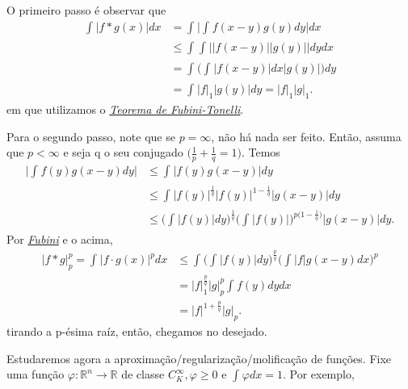 \documentclass[MeasureTheory/measure_theory.tex]{subfiles}
\begin{document}
\begin{proof*}
	O primeiro passo é observar que
	\begin{align*}
		\int_{}^{}|f*g(x)|dx & = \int_{}^{}\biggl\vert \int_{}^{}f(x-y)g(y)dy \biggr\vert dx        \\
		                     & \leq \int_{}^{}\int_{}^{}\biggl\vert |f(x-y)||g(y)| \biggr\vert dydx \\
		                     & =\int_{}^{}\biggl(\int_{}^{}|f(x-y)|dx|g(y)|\biggr)dy                \\
		                     & = \int_{}^{}|f|_1|g(y)|dy = |f|_1|g|_1.
	\end{align*}
	em que utilizamos o \hyperlink{fubini_tonelli}{\textit{Teorema de Fubini-Tonelli}}.

	Para o segundo passo, note que se \(p = \infty\), não há nada ser feito. Então, assuma que \(p < \infty\) e seja q o seu conjugado \(\biggl(\frac{1}{p} + \frac{1}{q} = 1\biggr)\). Temos
	\begin{align*}
		\biggl\vert \int_{}^{}f(y)g(x-y)dy \biggr\vert & \leq \int_{}^{}|f(y)g(x-y)|dy                                                                                                \\
		                                               & \leq \int_{}^{}|f(y)|^{\frac{1}{q}}|f(y)|^{1-\frac{1}{q}}|g(x-y)|dy                                                          \\
		                                               & \leq \biggl(\int_{}^{}|f(y)|dy\biggr)^{\frac{1}{q}}\biggl(\int_{}^{}|f(y)|\biggr)^{p \biggl(1-\frac{1}{q}\biggr)}|g(x-y)|dy.
	\end{align*}
	Por \hyperlink{fubini_tonelli}{\textit{Fubini}} e o acima,
	\begin{align*}
		|f*g|_{p}^{p} = \int_{}^{}|f \cdot g(x)|^{p}dx & \leq \int_{}^{}\biggl(\int_{}^{}|f(y)|dy\biggr)^{\frac{p}{q}}\biggl(\int_{}^{}|f|g(x-y)dx\biggr)^{p} \\
		                                               & = |f|_{1}^{\frac{p}{q}}|g|_{p}^{p}\int_{}^{}f(y)dydx                                                 \\
		                                               & = |f|^{1 + \frac{p}{q}}|g|_{p}.
	\end{align*}
	tirando a p-ésima raíz, então, chegamos no desejado. \qedsymbol
\end{proof*}
Estudaremos agora a aproximação/regularização/molificação de funções. Fixe uma função \(\varphi : \mathbb{R}^{n}\rightarrow \mathbb{R}\) de classe \(C_{K}^{\infty}, \varphi \geq 0\) e \(\int_{}^{}\varphi dx = 1\). Por exemplo,
\end{document}
